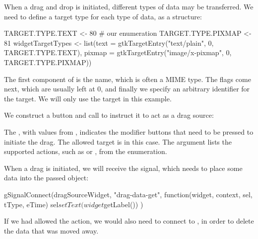 When a drag and drop is initiated, different types of data may be
transferred. We need to define a target type for each type of data, as
a  structure:
\begin{Schunk}
\begin{Sinput}
 TARGET.TYPE.TEXT   <- 80                # our enumeration
 TARGET.TYPE.PIXMAP <- 81                  
 widgetTargetTypes <- 
   list(text = gtkTargetEntry("text/plain", 0, 
          TARGET.TYPE.TEXT),
        pixmap = gtkTargetEntry("image/x-pixmap", 0, 
          TARGET.TYPE.PIXMAP))
\end{Sinput}
\end{Schunk}
%
The first component of  is the name, which is often
a MIME type. The flags come next, which are usually left at $0$, and
finally we specify an arbitrary identifier for the target. We will
only use the  target in this example.

We construct a button and call  to instruct
it to act as a drag source:
\begin{Schunk}
\end{Schunk}
%
The , with values from
, indicates the modifier buttons that need to
be pressed to initiate the drag. The allowed target is  in
this case. The  argument lists the
supported actions, such as  or , from the
 enumeration.

When a drag is initiated, we will receive the 
signal, which needs to place some data into the passed
 object:
\begin{Schunk}
\begin{Sinput}
 gSignalConnect(dragSourceWidget, "drag-data-get", 
                function(widget, context, sel, tType, eTime) {
                  sel$setText(widget$getLabel()) 
                })
\end{Sinput}
\end{Schunk}
%
If we had allowed the  action, we would also need to
connect to , in order to delete the data that
was moved away.

